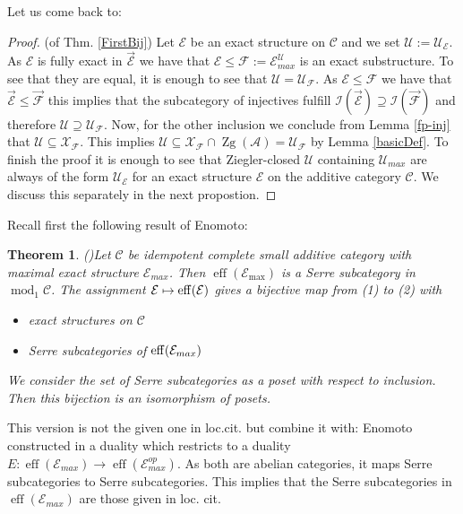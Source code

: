 \documentclass[11pt,a4paper]{amsart}
\theoremstyle{plain}
\newtheorem{thm}{Theorem}[section]
\theoremstyle{definition}
\DeclareMathOperator{\modu}{mod}
\DeclareMathOperator{\eff}{eff}
\newcommand{\mcA}{\mathcal{A}}
\newcommand{\mcC}{\mathcal{C}}
\newcommand{\mcE}{\mathcal{E}}
\newcommand{\mcF}{\mathcal{F}}
\newcommand{\mcI}{\mathcal{I}}
\newcommand{\mcU}{\mathcal{U}}
\newcommand{\mcX}{\mathcal{X}}
\DeclareMathOperator{\Zg}{Zg}
\begin{document}
Let us come back to: 
\begin{proof} (of Thm. \ref{FirstBij})
Let $\mcE$ be an exact structure on $\mcC$ and we set $\mcU:=\mcU_{\mcE}$. As $\mcE$ is fully exact in $\overrightarrow{\mcE}$ we have that $\mcE\leq \mcF:= \mcE_{max}^{\mcU}$ is an exact substructure. To see that they are equal, it is enough to see that $\mcU=\mcU_{\mcF}$. As $\mcE\leq \mcF$ we have that $\overrightarrow{\mcE}\leq \overrightarrow{\mcF}$ this implies that the subcategory of injectives fulfill $\mcI(\overrightarrow{\mcE})\supseteq \mcI (\overrightarrow{\mcF})$ and therefore $\mcU \supseteq \mcU_{\mcF}$.  Now, for the other inclusion we conclude from Lemma \ref{fp-inj} that $\mcU\subseteq \mcX_{\mcF}$. This implies $\mcU \subseteq \mcX_{\mcF} \cap \Zg (\mcA) = \mcU_{\mcF}$ by Lemma \ref{basicDef}. To finish the proof it is enough to see that Ziegler-closed $\mcU$ containing $\mcU_{max}$ are always of the form $\mcU_{\mcE}$ for an exact structure $\mcE$ on the additive category $\mcC$. We discuss this separately in the next propostion. 
\end{proof}
Recall first the following result of Enomoto: 
\begin{thm} (\cite[Thm 2.7]{E})\label{EnoBij}
Let $\mcC$ be idempotent complete small additive category with maximal exact structure $\mcE_{max}$. Then $\eff(\mcE_{\max})$ is a Serre subcategory in $\modu_1\mcC$. 
The assignment $\mcE\mapsto {\rm eff}(\mcE)$ gives a bijective map from (1) to (2) with 
\begin{itemize}
\item[(1)] exact structures on $\mcC$
\item[(2)] Serre subcategories of ${\rm eff}(\mcE_{max})$
\end{itemize}
We consider the set of Serre subcategories as a poset with respect to inclusion. Then this bijection is an isomorphism of posets. 
\end{thm}
This version is not the given one in loc.cit. but combine it with: Enomoto constructed in \cite[Lem 2.5]{E} a duality which restricts to a duality $E\colon \eff(\mcE_{max})\to \eff (\mcE_{max}^{op})$. As both are abelian categories, it maps Serre subcategories to Serre subcategories. This implies that the Serre subcategories in $\eff(\mcE_{max})$ are those given in loc. cit.  
\end{document}

